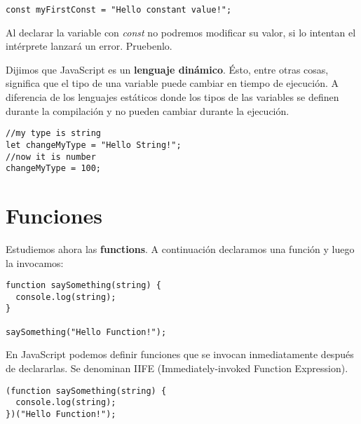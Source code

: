 \documentclass[a4paper, oneside, titlepage, 12pt]{paper}
\begin{document}
\begin{verbatim}
const myFirstConst = "Hello constant value!";
\end{verbatim}

Al declarar la variable con \textit{const} no podremos modificar su valor, si lo intentan el intérprete lanzará un error. Pruebenlo.  
\newline

Dijimos que JavaScript es un \textbf{lenguaje dinámico}. Ésto, entre otras cosas, significa que el tipo de una variable puede cambiar en tiempo de ejecución. A diferencia de los lenguajes estáticos donde los tipos de las variables se definen durante la compilación y no pueden cambiar durante la ejecución.

\begin{verbatim}
//my type is string
let changeMyType = "Hello String!";
//now it is number
changeMyType = 100;
\end{verbatim}

\section{Funciones} \label{functions}

Estudiemos ahora las \textbf{functions}. A continuación declaramos una función y luego la invocamos:

\begin{verbatim}
function saySomething(string) {
  console.log(string);
}

saySomething("Hello Function!");
\end{verbatim}

En JavaScript podemos definir funciones que se invocan inmediatamente después de declararlas. Se denominan IIFE (Immediately-invoked Function Expression).

\begin{verbatim}
(function saySomething(string) {
  console.log(string);
})("Hello Function!");
\end{verbatim}
\end{document}
